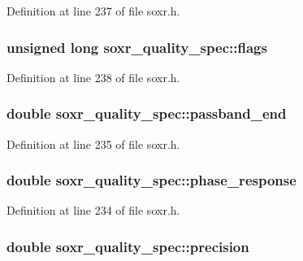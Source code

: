 Definition at line 237 of file soxr.\+h.

\subsubsection[{\texorpdfstring{flags}{flags}}]{\setlength{\rightskip}{0pt plus 5cm}unsigned long soxr\+\_\+quality\+\_\+spec\+::flags}\hypertarget{structsoxr__quality__spec_a98847fe09120e95915753fa31363698e}{}\label{structsoxr__quality__spec_a98847fe09120e95915753fa31363698e}


Definition at line 238 of file soxr.\+h.

\subsubsection[{\texorpdfstring{passband\+\_\+end}{passband_end}}]{\setlength{\rightskip}{0pt plus 5cm}double soxr\+\_\+quality\+\_\+spec\+::passband\+\_\+end}\hypertarget{structsoxr__quality__spec_aac468916caf37b279bffc2f30d004fa8}{}\label{structsoxr__quality__spec_aac468916caf37b279bffc2f30d004fa8}


Definition at line 235 of file soxr.\+h.

\subsubsection[{\texorpdfstring{phase\+\_\+response}{phase_response}}]{\setlength{\rightskip}{0pt plus 5cm}double soxr\+\_\+quality\+\_\+spec\+::phase\+\_\+response}\hypertarget{structsoxr__quality__spec_ad600c30fb76a8faf3ac1709d3ab08595}{}\label{structsoxr__quality__spec_ad600c30fb76a8faf3ac1709d3ab08595}


Definition at line 234 of file soxr.\+h.

\subsubsection[{\texorpdfstring{precision}{precision}}]{\setlength{\rightskip}{0pt plus 5cm}double soxr\+\_\+quality\+\_\+spec\+::precision}\hypertarget{structsoxr__quality__spec_a06805b7bfc9d7f273489e2bad228bcc8}{}\label{structsoxr__quality__spec_a06805b7bfc9d7f273489e2bad228bcc8}


